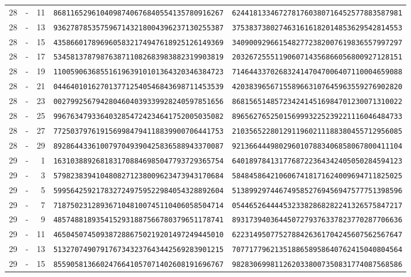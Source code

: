\begin{longtable}{@{}rcrll@{}}
28&-&11&\texttt{8681165296104098740676840554135780916267}&\texttt{6244181334672781760380716452577883587981}\\
28&-&13&\texttt{9362787853575967143218004396237130255387}&\texttt{3753837380274631616182014853629542814553}\\
28&-&15&\texttt{4358660178969605832174947618925126149369}&\texttt{3409009296615482772382007619836557997297}\\
28&-&17&\texttt{5345813787987638711082683983882319903819}&\texttt{2032672555119060714356866056800927128151}\\
28&-&19&\texttt{1100590636855161963910101364320346384723}&\texttt{7146443370268324147047006407110004659088}\\
28&-&21&\texttt{0446401016270137712540546843698711453539}&\texttt{4203839656715589663107645963559276902820}\\
28&-&23&\texttt{0027992567942804604039339928240597851656}&\texttt{8681565148572342414516984701230071310022}\\
28&-&25&\texttt{9967634793364032854724234641752005035082}&\texttt{8965627652501569993225239221116046484733}\\
28&-&27&\texttt{7725037976191569984794118839900706441753}&\texttt{2103565228012911960211188380455712956085}\\
28&-&29&\texttt{8928644336100797049390425836588943370087}&\texttt{9213664449802960107883406858067800411104}\\
29&-&1&\texttt{1631038892681831708846985047793729365754}&\texttt{6401897841317768722364342405050284594123}\\
29&-&3&\texttt{5798238394104808271238009623473943170684}&\texttt{5848458642106067418171624009694711825025}\\
29&-&5&\texttt{5995642592178327249759522984054328892604}&\texttt{5138992974467495852769456947577751398596}\\
29&-&7&\texttt{7187502312893671048100745110406058504714}&\texttt{0544652644445323382868282241326575847217}\\
29&-&9&\texttt{4857488189354152931887566780379651178741}&\texttt{8931739403644507279376337823770287706636}\\
29&-&11&\texttt{4650450745093872886750219201497249445010}&\texttt{6223149507752788426361704245607562567647}\\
29&-&13&\texttt{5132707490791767343237643442569283901215}&\texttt{7077177962135188658958640762415040804564}\\
29&-&15&\texttt{8559058136602476641057071402608191696767}&\texttt{9828306998112620338007350831774087568586}\\

\end{longtable}
